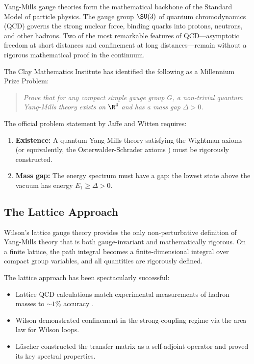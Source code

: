 \documentclass[12pt, a4paper]{article}
\theoremstyle{plain}
\theoremstyle{definition}
\begin{document}
Yang-Mills gauge theories \citep{YangMills1954} form the mathematical backbone
of the Standard Model of particle physics. The gauge group $\SU(3)$ of quantum
chromodynamics (QCD) governs the strong nuclear force, binding quarks into protons,
neutrons, and other hadrons. Two of the most remarkable features of QCD---asymptotic
freedom \citep{GrossWilczek1973, Politzer1973} at short distances and confinement
at long distances---remain without a rigorous mathematical proof in the continuum.

The Clay Mathematics Institute \citep{ClayYM} has identified the following as a
Millennium Prize Problem:

\begin{quote}
  \emph{Prove that for any compact simple gauge group $G$, a non-trivial quantum
  Yang-Mills theory exists on $\R^4$ and has a mass gap $\Delta > 0$.}
\end{quote}

The official problem statement by Jaffe and Witten \citep{JaffeWitten2000}
requires:
\begin{enumerate}[label=(\roman*)]
  \item \textbf{Existence:} A quantum Yang-Mills theory satisfying the
    Wightman axioms \citep{Wightman1964} (or equivalently, the
    Osterwalder-Schrader axioms \citep{OsterwalderSchrader1973,
    OsterwalderSchrader1975}) must be rigorously constructed.
  \item \textbf{Mass gap:} The energy spectrum must have a gap: the
    lowest state above the vacuum has energy $E_1 \geq \Delta > 0$.
\end{enumerate}

\subsection{The Lattice Approach}

Wilson's lattice gauge theory \citep{Wilson1974} provides the only
non-perturbative definition of Yang-Mills theory that is both gauge-invariant
and mathematically rigorous. On a finite lattice, the path integral becomes a
finite-dimensional integral over compact group variables, and all quantities
are rigorously defined.

The lattice approach has been spectacularly successful:
\begin{itemize}
  \item Lattice QCD calculations match experimental measurements of
    hadron masses to $\sim\!1\%$ accuracy \citep{RotheBook}.
  \item Wilson \citep{Wilson1974} demonstrated confinement in the
    strong-coupling regime via the area law for Wilson loops.
  \item L\"uscher \citep{Luscher1977} constructed the transfer matrix
    as a self-adjoint operator and proved its key spectral properties.
\end{itemize}
\end{document}
